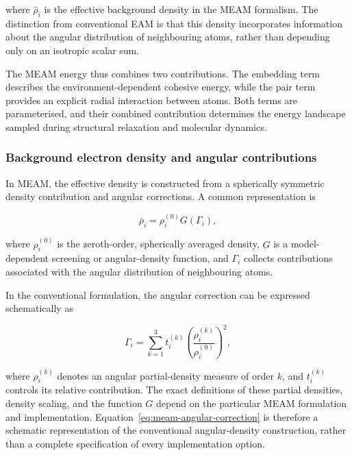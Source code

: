 where $\bar{\rho}_i$ is the effective background density in the MEAM formalism. The distinction 
from conventional EAM is that this density incorporates information about the angular distribution 
of neighbouring atoms, rather than depending only on an isotropic scalar sum.

The MEAM energy thus combines two contributions. The embedding term describes the 
environment-dependent cohesive energy, while the pair term provides an explicit radial 
interaction between atoms. Both terms are parameterised, and their combined contribution 
determines the energy landscape sampled during structural relaxation and molecular dynamics.

\subsubsection{Background electron density and angular contributions}

In MEAM, the effective density is constructed from a spherically symmetric density contribution 
and angular corrections. A common representation is

\begin{equation}
    \bar{\rho}_i
    = \rho_i^{(0)} G(\Gamma_i),
    \label{eq:meam-effective-density}
\end{equation}

where $\rho_i^{(0)}$ is the zeroth-order, spherically averaged density, $G$ is a model-dependent 
screening or angular-density function, and $\Gamma_i$ collects contributions associated with the 
angular distribution of neighbouring atoms.

In the conventional formulation, the angular correction can be expressed schematically as

\begin{equation}
    \Gamma_i =
    \sum_{k=1}^{3} t_i^{(k)}
    \left(
        \frac{\rho_i^{(k)}}{\rho_i^{(0)}}
    \right)^2,
    \label{eq:meam-angular-correction}
\end{equation}

where $\rho_i^{(k)}$ denotes an angular partial-density measure of order $k$, and $t_i^{(k)}$ controls 
its relative contribution. The exact definitions of these partial densities, density scaling, and the function 
$G$ depend on the particular MEAM formulation and implementation. Equation~\ref{eq:meam-angular-correction} is 
therefore a schematic representation of the conventional angular-density construction, rather than a complete 
specification of every implementation option.

